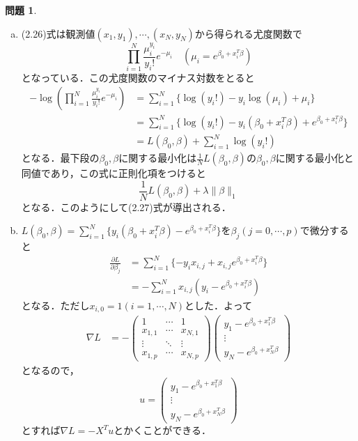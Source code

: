 \documentclass{jsarticle}
\theoremstyle{definition}
\newtheorem{Ex}{問題}
\theoremstyle{mystyle} %
\begin{document}
\begin{Ex}
\begin{enumerate}[(a)]
\item (2.26)式は観測値$(x_1,y_1),\cdots,(x_N,y_N)$から得られる尤度関数で
$$\prod_{i=1}^N\frac{\mu_i^{y_i}}{y_i!}e^{-\mu_i}\quad (\mu_i = e^{\beta_0+x_i^T \beta})$$
となっている．この尤度関数のマイナス対数をとると
\begin{align*}
-\log\left(\prod_{i=1}^N\frac{\mu_i^{y_i}}{y_i!}e^{-\mu_i}\right)&=\sum_{i=1}^N\{\log(y_i!)-y_i\log(\mu_i)+\mu_i\}\\
&=\sum_{i=1}^N\{\log(y_i!)-y_i(\beta_0+x_i^T\beta)+e^{\beta_0+x_i^T\beta}\}\\
&=L(\beta_0,\beta)+\sum_{i=1}^N \log(y_i!)
\end{align*}
となる．最下段の$\beta_0,\beta$に関する最小化は$\frac{1}{N}L(\beta_0,\beta)$の$\beta_0,\beta$に関する最小化と同値であり，この式に正則化項をつけると
$$\frac{1}{N}L(\beta_0,\beta)+\lambda\|\beta\|_1$$
となる．このようにして(2.27)式が導出される．\\

\item $L(\beta_0,\beta)=\sum_{i=1}^N\{y_i(\beta_0+x_i^T \beta)-e^{\beta_0+ x_i^T \beta}\}$を$\beta_j(j=0,\cdots,p)$で微分すると
\begin{align*}
\frac{\partial L}{\partial \beta_j} &=\sum_{i=1}^N \{-y_i x_{i,j}+x_{i,j}e^{\beta_0+ x_i^T \beta}\}\\
&=-\sum_{i=1}^N x_{i,j}(y_i-e^{\beta_0+ x_i^T \beta})
\end{align*}
となる．ただし$x_{i,0}=1(i=1,\cdots,N)$とした．よって
\begin{align*}
\nabla L&=-\begin{pmatrix}
1 & \cdots & 1\\
x_{1,1} & \cdots & x_{N,1}\\
\vdots & \ddots & \vdots \\
x_{1,p} & \cdots & x_{N,p}
\end{pmatrix}\left(\begin{array}{c}
y_1-e^{\beta_0+x_1^T \beta}\\
\vdots\\
y_N-e^{\beta_0+x_N^T \beta}
\end{array}\right)
\end{align*}
となるので，
$$u=\left(\begin{array}{c}
y_1-e^{\beta_0+x_1^T \beta}\\
\vdots\\
y_N-e^{\beta_0+x_N^T \beta}
\end{array}\right)$$
とすれば$\nabla L = -X^T u$とかくことができる．\\


\end{enumerate}
\end{Ex}
\end{document}
